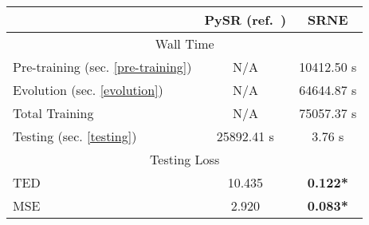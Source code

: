 \begin{tabular}{| l || c | c | } \hline
       
   & PySR (ref.~\cite{Cranmer2023}) & SRNE  \\ \hline \hline
     \multicolumn{3}{|c|}{Wall Time} \\ \hline
Pre-training (sec. \ref{pre-training})          & N/A & 10412.50 s      \\ \hline
Evolution (sec. \ref{evolution})          & N/A &  64644.87 s    \\ \hline
Total Training          & N/A & 75057.37 s     \\ \hline
Testing (sec. \ref{testing}) & 25892.41 s & 3.76 s      \\ \hline\hline
\multicolumn{3}{|c|}{Testing Loss} \\ \hline
TED           & 10.435 & \textbf{0.122*}     \\ \hline
MSE           & 2.920 & \textbf{0.083*}     \\ \hline
\end{tabular}